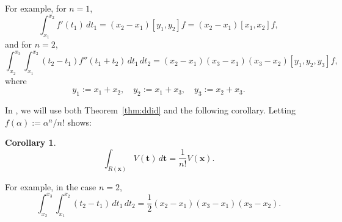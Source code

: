 \documentclass[12pt]{article}
\def\bft{\mathbf{t}}
\def\bfx{\mathbf{x}}
\newtheorem{corollary}{Corollary}
\begin{document}
For example, for $n=1$,
$$ \int_{x_1}^{x_2} f'(t_1) \, dt_1
= (x_2-x_1) [y_1,y_2]f
= (x_2-x_1) [x_1,x_2]f, $$
and for $n=2$,
$$ \int_{x_2}^{x_3} \int_{x_1}^{x_2}
(t_2-t_1)
f''(t_1+t_2) \, dt_1 \, dt_2
= (x_2-x_1) (x_3-x_1)(x_3-x_2) [y_1,y_2,y_3]f, $$
where
$$ y_1 := x_1 + x_2, \quad y_2 := x_1 + x_3,  \quad y_3 := x_2 + x_3. $$

In \cite{Floater:2026b}, we will use both Theorem~\ref{thm:ddid} and the
following corollary.
Letting $f(\alpha) := \alpha^n/n!$ shows:
\begin{corollary}\label{cor:vandint}
$$ \int_{R(\bfx)} V(\bft) \, d\bft = \frac{1}{n!} V(\bfx).  $$
\end{corollary}
For example, in the case $n=2$,
$$ \int_{x_2}^{x_3} \int_{x_1}^{x_2} (t_2-t_1) \, dt_1 \, dt_2
= \frac{1}{2} (x_2-x_1) (x_3-x_1)(x_3-x_2). $$

\end{document}
